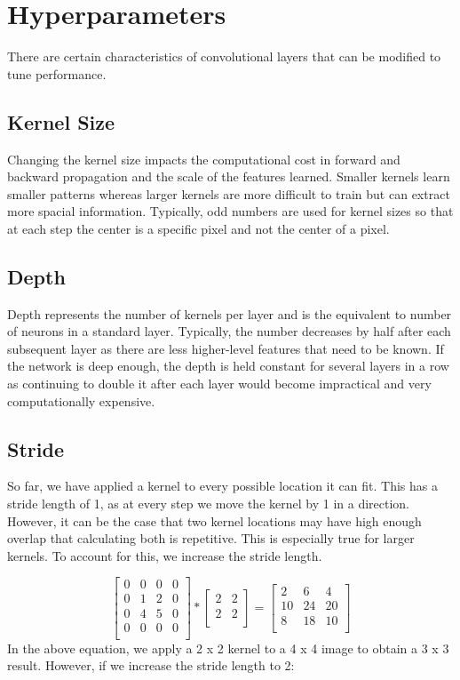\documentclass{exam}
\begin{document}
\section{Hyperparameters}
There are certain characteristics of convolutional layers that can be modified to tune performance.

\subsection{Kernel Size}
Changing the kernel size impacts the computational cost in forward and backward propagation and the scale of the features learned. Smaller kernels learn smaller patterns whereas larger kernels are more difficult to train but can extract more spacial information. Typically, odd numbers are used for kernel sizes so that at each step the center is a specific pixel and not the center of a pixel.

\subsection{Depth}
Depth represents the number of kernels per layer and is the equivalent to number of neurons in a standard layer. Typically, the number decreases by half after each subsequent layer as there are less higher-level features that need to be known. If the network is deep enough, the depth is held constant for several layers in a row as continuing to double it after each layer would become impractical and very computationally expensive. 

\subsection{Stride}
So far, we have applied a kernel to every possible location it can fit. This has a stride length of 1, as at every step we move the kernel by 1 in a direction. However, it can be the case that two kernel locations may have high enough overlap that calculating both is repetitive. This is especially true for larger kernels. To account for this, we increase the stride length.

\[
\begin{bmatrix}
    0 & 0 & 0 & 0\\
    0 & 1 & 2 & 0\\
    0 & 4 & 5 & 0\\
    0 & 0 & 0 & 0\\
\end{bmatrix}
 *
\begin{bmatrix}
    2 & 2\\
    2 & 2\\
\end{bmatrix}
=
\begin{bmatrix}
    2 & 6 & 4\\
    10 & 24 & 20\\
    8 & 18 & 10\\
\end{bmatrix}
\]
In the above equation, we apply a 2 x 2 kernel to a 4 x 4 image to obtain a 3 x 3 result. However, if we increase the stride length to 2:
\end{document}
